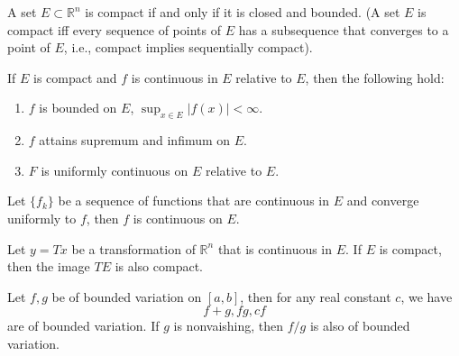 \documentclass[openany]{book}
\newcommand{\R}{\mathbb{R}}
\begin{document}
\begin{thm}
    A set $E\subset\R^n$ is compact if and only if it is closed and bounded. (A set $E$ is compact iff every sequence of points of $E$ has a subsequence that converges to a point of $E$, i.e., compact implies sequentially compact).
\end{thm}
\begin{thm}
    If $E$ is compact and $f$ is continuous in $E$ relative to $E$, then the following hold:
    \begin{enumerate}
        \item $f$ is bounded on $E$, $\sup_{x\in E}|f(x)|<\infty$.
        \item $f$ attains supremum and infimum on $E$.
        \item $F$ is uniformly continuous on $E$ relative to $E$.
    \end{enumerate}
\end{thm}
\begin{thm}
    Let $\{f_k\}$ be a sequence of functions that are continuous in $E$ and converge uniformly to $f$, then $f$ is continuous on $E$. 
\end{thm}
\begin{prop}
    Let $y=Tx$ be a transformation of $\R^n$ that is continuous in $E$. If $E$ is compact, then the image $TE$ is also compact.
\end{prop}
\begin{prop}
    Let $f,g$ be of bounded variation on $[a,b]$, then for any real constant $c$, we have 
    \begin{equation*}
        f+g, fg, cf
    \end{equation*}
    are of bounded variation. If $g$ is nonvaishing, then $f/g$ is also of bounded variation.
\end{prop}
\end{document}
